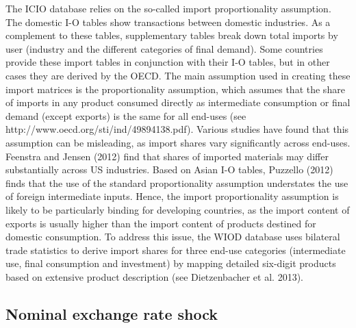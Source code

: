 \documentclass[11pt,a4paper]{article}
\begin{document}
The ICIO database relies on the so-called import proportionality assumption. The domestic I-O tables show transactions between domestic industries. As a complement to these tables, supplementary tables break down total imports by user (industry and the different categories of final demand). Some countries provide these import tables in conjunction with their I-O tables, but in other cases they are derived by the OECD. The main assumption used in creating these import matrices is the proportionality assumption, which assumes that the share of imports in any product consumed directly as intermediate consumption or final demand (except exports) is the same for all end-uses (see http://www.oecd.org/sti/ind/49894138.pdf). Various studies have found that this assumption can be misleading, as import shares vary significantly across end-uses. Feenstra and Jensen (2012) find that shares of imported materials may differ substantially across US industries. Based on Asian I-O tables, Puzzello (2012) finds that the use of the standard proportionality assumption understates the use of foreign intermediate inputs. Hence, the import proportionality assumption is likely to be particularly binding for developing countries, as the import content of exports is usually higher than the import content of products destined for domestic consumption. To address this issue, the WIOD database uses bilateral trade statistics to derive import shares for three end-use categories (intermediate use, final consumption and investment) by mapping detailed six-digit products based on extensive product description (see Dietzenbacher et al. 2013).

\subsection{Nominal exchange rate shock}
\label{subsec:chocchange}
\end{document}
